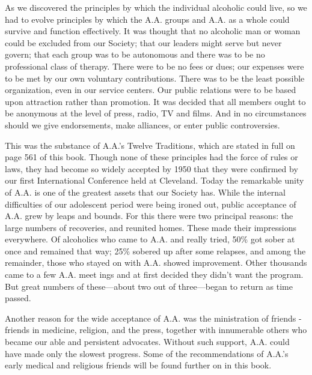 \begin{biblechapter}
\verse As we discovered the principles by which the individual alcoholic could live, 
    so we had to evolve principles by which the A.A. groups and A.A. as a whole 
    could survive and function effectively. 
\verse It was thought that no alcoholic man or woman could be excluded from our Society; 
    that our leaders might serve but never govern; 
    that each group was to be autonomous and there was to be no professional class of therapy.
\verse There were to be no fees or dues; 
    our expenses were to be met by our own voluntary contributions. 
\verse There was to be the least possible organization, even in our service centers. 
\verse Our public relations were to be based upon attraction rather than promotion. 
\verse It was decided that all members ought to be anonymous at the level of press, radio, TV and films. 
\verse And in no circumstances should we give endorsements, make alliances, or enter public controversies.

\verse This was the substance of A.A.’s Twelve Traditions, which are stated in full on page 561 of this book.
\verse Though none of these principles had the force of rules or laws, 
    they had become so widely accepted by 1950 
    that they were confirmed by our first International Conference held at Cleveland. 
\verse Today the remarkable unity of A.A. is one of the greatest assets that our Society has.
\verse While the internal difficulties of our adolescent period were being ironed out, 
    public acceptance of A.A. grew by leaps and bounds.
\verse For this there were two principal reasons:
    the large numbers of recoveries, and reunited homes.
\verse These made their impressions everywhere.
\verse Of alcoholics who came to A.A. and really tried, 
    50\% got sober at once and remained that way;
    25\% sobered up after some relapses, 
    and among the remainder, those who stayed on with A.A. showed improvement.
\verse Other thousands came to a few A.A. meet ings and at first decided they didn’t want the program. 
\verse But great numbers of these—about two out of three—began to return as time passed.

\verse Another reason for the wide acceptance of A.A. was the ministration of friends - 
    friends in medicine, religion, and the press, 
    together with innumerable others who became our able and persistent advocates.
\verse Without such support, A.A. could have made only the slowest progress.
\verse Some of the recommendations of A.A.’s early medical and religious friends will be found further on in this book.


\end{biblechapter}
